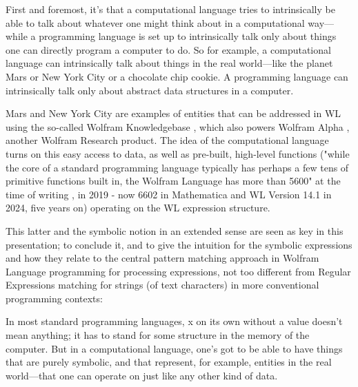 \begin{displayquote}
First and foremost, it’s that a computational language tries to intrinsically be able to talk about whatever one might think about in a computational way—while a programming language is set up to intrinsically talk only about things one can directly program a computer to do. So for example, a computational language can intrinsically talk about things in the real world—like the planet Mars or New York City or a chocolate chip cookie. A programming language can intrinsically talk only about abstract data structures in a computer. \cite{noauthor_what_2019}
\end{displayquote}

Mars \cite{noauthor_planetwolfram_nodate} and New York City \cite{noauthor_citywolfram_nodate} are examples of entities that can be addressed in WL using the so-called Wolfram Knowledgebase \cite{noauthor_wolfram_nodate}, which also powers Wolfram Alpha \cite{noauthor_curated_nodate}, another Wolfram Research product. The idea of the computational language turns on this easy access to data, as well as pre-built, high-level functions ("while the core of a standard programming language typically has perhaps a few tens of primitive functions built in, the Wolfram Language has more than 5600" at the time of writing \cite{noauthor_what_2019}, in 2019 - now 6602 in Mathematica and WL Version 14.1 \cite{noauthor_story_2024} in 2024, five years on) operating on the WL expression structure. 

This latter and the symbolic notion in an extended sense are seen as key in this presentation; to conclude it, and to give the intuition for the symbolic expressions and how they relate to the central pattern matching approach in Wolfram Language programming for processing expressions, not too different from Regular Expressions matching for strings (of text characters) in more conventional programming contexts: 

\begin{displayquote}
In most standard programming languages, x on its own without a value doesn’t mean anything; it has to stand for some structure in the memory of the computer. But in a computational language, one’s got to be able to have things that are purely symbolic, and that represent, for example, entities in the real world—that one can operate on just like any other kind of data.\cite{noauthor_what_2019}
\end{displayquote}

